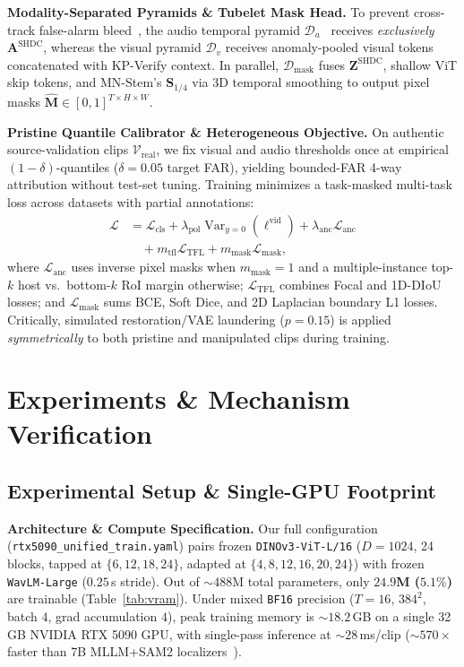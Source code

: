 \documentclass[10pt,twocolumn]{article}
\begin{document}
\noindent\textbf{Modality-Separated Pyramids \& Tubelet Mask Head.} To prevent cross-track false-alarm bleed~\cite{huang2026avfable}, the audio temporal pyramid $\mathcal{D}_a$~\cite{zhang2022actionformer} receives \emph{exclusively} $\mathbf{A}^{\text{SHDC}}$, whereas the visual pyramid $\mathcal{D}_v$ receives anomaly-pooled visual tokens concatenated with KP-Verify context. In parallel, $\mathcal{D}_{\text{mask}}$ fuses $\mathbf{Z}^{\text{SHDC}}$, shallow ViT skip tokens, and MN-Stem's $\mathbf{S}_{1/4}$ via 3D temporal smoothing to output pixel masks $\hat{\mathbf{M}} \in [0,1]^{T\times H\times W}$.

\noindent\textbf{Pristine Quantile Calibrator \& Heterogeneous Objective.} On authentic source-validation clips $\mathcal{V}_{\text{real}}$, we fix visual and audio thresholds once at empirical $(1-\delta)$-quantiles ($\delta=0.05$ target FAR), yielding bounded-FAR 4-way attribution without test-set tuning. Training minimizes a task-masked multi-task loss across datasets with partial annotations:
\begin{align}
    \mathcal{L} &= \mathcal{L}_{\text{cls}} + \lambda_{\text{pol}}\operatorname{Var}_{y=0}(\ell^{\text{vid}}) + \lambda_{\text{anc}}\mathcal{L}_{\text{anc}} \nonumber\\
    &\quad + m_{\text{tfl}}\mathcal{L}_{\text{TFL}} + m_{\text{mask}}\mathcal{L}_{\text{mask}},
    \label{eq:loss}
\end{align}
where $\mathcal{L}_{\text{anc}}$ uses inverse pixel masks when $m_{\text{mask}}=1$ and a multiple-instance top-$k$ host vs.\ bottom-$k$ RoI margin otherwise; $\mathcal{L}_{\text{TFL}}$ combines Focal and 1D-DIoU losses; and $\mathcal{L}_{\text{mask}}$ sums BCE, Soft Dice, and 2D Laplacian boundary L1 losses. Critically, simulated restoration/VAE laundering ($p=0.15$) is applied \emph{symmetrically} to both pristine and manipulated clips during training.

\section{Experiments \& Mechanism Verification}
\label{sec:experiments}

\subsection{Experimental Setup \& Single-GPU Footprint}
\label{subsec:setup}
\noindent\textbf{Architecture \& Compute Specification.} Our full configuration (\texttt{rtx5090\_unified\_train.yaml}) pairs frozen \texttt{DINOv3-ViT-L/16} ($D=1024$, 24 blocks, tapped at $\{6,12,18,24\}$, adapted at $\{4,8,12,16,20,24\}$) with frozen \texttt{WavLM-Large} ($0.25$\,s stride). Out of ${\sim}488$M total parameters, only \textbf{$24.9$M ($5.1\%$)} are trainable (Table~\ref{tab:vram}). Under mixed \texttt{BF16} precision ($T=16$, $384^2$, batch $4$, grad accumulation $4$), peak training memory is ${\sim}18.2$\,GB on a single 32\,GB NVIDIA RTX 5090 GPU, with single-pass inference at ${\sim}28$\,ms/clip (${\sim}570\times$ faster than 7B MLLM+SAM2 localizers~\cite{kang2026manividlens}).
\end{document}
